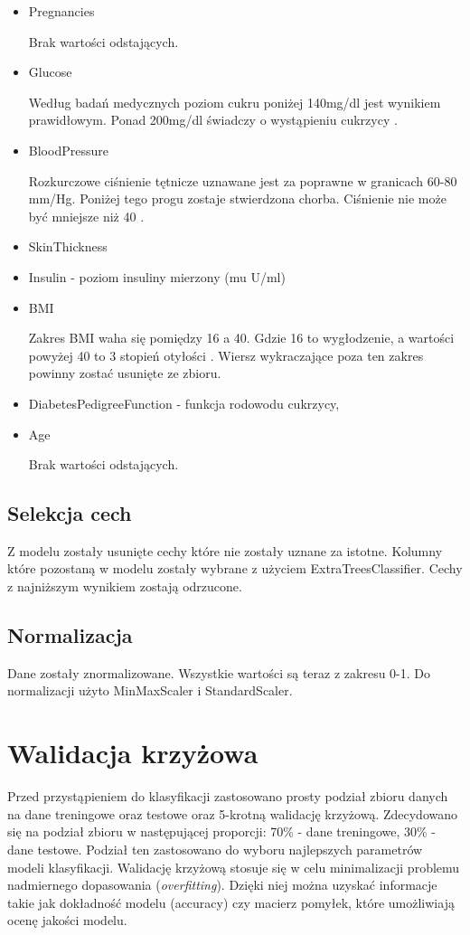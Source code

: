 \documentclass[12pt]{article}
\begin{document}
\begin{itemize}
\item Pregnancies

	Brak wartości odstających.
\item Glucose 

	Według badań medycznych poziom cukru poniżej 140mg/dl jest wynikiem prawidłowym. Ponad 200mg/dl świadczy o wystąpieniu cukrzycy \cite{sugarLevel}.
\item BloodPressure 

	Rozkurczowe ciśnienie tętnicze uznawane jest za poprawne w granicach 60-80 mm/Hg. Poniżej tego progu zostaje stwierdzona chorba. Ciśnienie nie może być mniejsze niż 40 \cite{pressure}.
\item SkinThickness


\item Insulin - poziom insuliny mierzony (mu U/ml)
\item BMI 

	Zakres BMI waha się pomiędzy 16 a 40. Gdzie 16 to wygłodzenie, a wartości powyżej 40 to 3 stopień otyłości \cite{bmi}. Wiersz wykraczające poza ten zakres powinny zostać usunięte ze zbioru.
	
\item DiabetesPedigreeFunction - funkcja rodowodu cukrzycy,
\item Age
	
	Brak wartości odstających.

\end{itemize}
\subsection{Selekcja cech}
	Z modelu zostały usunięte cechy które nie zostały uznane za istotne. Kolumny które pozostaną w modelu zostały wybrane z użyciem ExtraTreesClassifier. Cechy z najniższym wynikiem zostają odrzucone.  
\subsection{Normalizacja}
	Dane zostały znormalizowane. Wszystkie wartości są teraz z zakresu 0-1. Do normalizacji użyto MinMaxScaler i StandardScaler.

\section{Walidacja krzyżowa}
	Przed przystąpieniem do klasyfikacji zastosowano prosty podział zbioru danych na dane treningowe oraz testowe oraz 5-krotną walidację krzyżową. Zdecydowano się na podział zbioru w następującej proporcji: 70\% - dane treningowe, 30\% - dane testowe. Podział ten zastosowano do wyboru najlepszych parametrów modeli klasyfikacji. 
	Walidację krzyżową stosuje się w celu minimalizacji problemu nadmiernego dopasowania (\textit{overfitting}). Dzięki niej można uzyskać informacje takie jak dokładność modelu (accuracy) czy macierz pomyłek, które umożliwiają ocenę jakości modelu.
	
\end{document}
